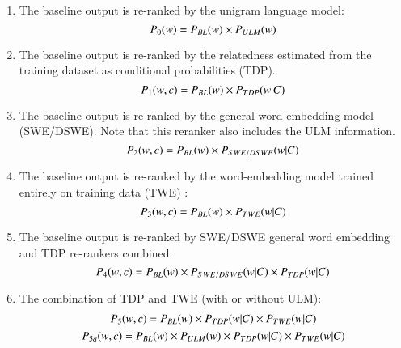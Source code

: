 \documentclass[phd,tocprelim]{cornell}
\begin{document}
\begin{enumerate}
\item The baseline output is re-ranked by the unigram language model:
\begin{equation}
\small P_0(w)=P_{BL}(w)\times P_{ULM}(w)
\label{eq:ULM}
\end{equation}

\item  The baseline output is re-ranked by the relatedness estimated from the training dataset as conditional probabilities (TDP).  
\begin{equation}
\small P_1(w,c)=P_{BL}(w)\times P_{TDP}(w\vert C)
\label{eq:TDP}
\end{equation}

\item The baseline output is re-ranked by the general word-embedding model (SWE/DSWE). Note that this reranker also includes the ULM information.
\begin{equation}
\small P_2(w,c)=P_{BL}(w)\times P_{SWE/DSWE}(w\vert C)
\label{eq:SWE}
\end{equation}


\item  The baseline output is re-ranked by the word-embedding model trained entirely on training data (TWE) :
\begin{equation}
\small P_3(w,c)=P_{BL}(w)\times P_{TWE}(w\vert C)
\label{eq:TWE}
\end{equation}

\item The baseline output is re-ranked by SWE/DSWE general  word  embedding  and TDP re-rankers combined: 
\begin{equation} \label{eq:SWE+TDP}
\small P_4(w,c)=P_{BL}(w)\times P_{SWE/DSWE}(w\vert C)\times P_{TDP}(w\vert C)
\end{equation}

\item The combination of TDP and TWE (with or without ULM):
\begin{gather}\label{eq:TDP+TWE}
\small P_5(w,c)=P_{BL}(w)\times P_{TDP}(w\vert C)\times P_{TWE}(w\vert C) \\ 
\small P_{5a}(w,c)=P_{BL}(w) \times P_{ULM}(w) \times P_{TDP}(w\vert C) \times P_{TWE}(w\vert C)
\end{gather}





\end{enumerate}
\end{document}
